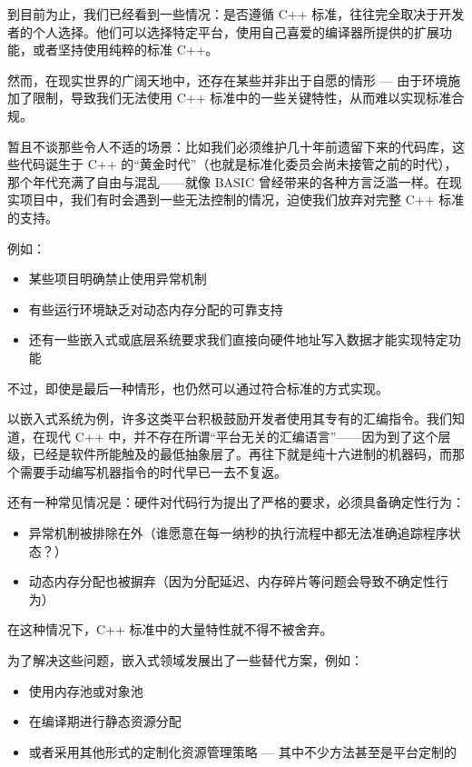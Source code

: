 到目前为止，我们已经看到一些情况：是否遵循 C++ 标准，往往完全取决于开发者的个人选择。他们可以选择特定平台，使用自己喜爱的编译器所提供的扩展功能，或者坚持使用纯粹的标准 C++。

然而，在现实世界的广阔天地中，还存在某些并非出于自愿的情形 --- 由于环境施加了限制，导致我们无法使用 C++ 标准中的一些关键特性，从而难以实现标准合规。

暂且不谈那些令人不适的场景：比如我们必须维护几十年前遗留下来的代码库，这些代码诞生于 C++ 的“黄金时代”（也就是标准化委员会尚未接管之前的时代），那个年代充满了自由与混乱——就像 BASIC 曾经带来的各种方言泛滥一样。在现实项目中，我们有时会遇到一些无法控制的情况，迫使我们放弃对完整 C++ 标准的支持。

例如：

\begin{itemize}
\item 
某些项目明确禁止使用异常机制

\item 
有些运行环境缺乏对动态内存分配的可靠支持

\item 
还有一些嵌入式或底层系统要求我们直接向硬件地址写入数据才能实现特定功能
\end{itemize}

不过，即使是最后一种情形，也仍然可以通过符合标准的方式实现。

以嵌入式系统为例，许多这类平台积极鼓励开发者使用其专有的汇编指令。我们知道，在现代 C++ 中，并不存在所谓“平台无关的汇编语言”——因为到了这个层级，已经是软件所能触及的最低抽象层了。再往下就是纯十六进制的机器码，而那个需要手动编写机器指令的时代早已一去不复返。

还有一种常见情况是：硬件对代码行为提出了严格的要求，必须具备确定性行为：

\begin{itemize}
\item 
异常机制被排除在外（谁愿意在每一纳秒的执行流程中都无法准确追踪程序状态？）

\item 
动态内存分配也被摒弃（因为分配延迟、内存碎片等问题会导致不确定性行为）
\end{itemize}

在这种情况下，C++ 标准中的大量特性就不得不被舍弃。

为了解决这些问题，嵌入式领域发展出了一些替代方案，例如：

\begin{itemize}
\item 
使用内存池或对象池

\item 
在编译期进行静态资源分配

\item 
或者采用其他形式的定制化资源管理策略 --- 其中不少方法甚至是平台定制的
\end{itemize}

